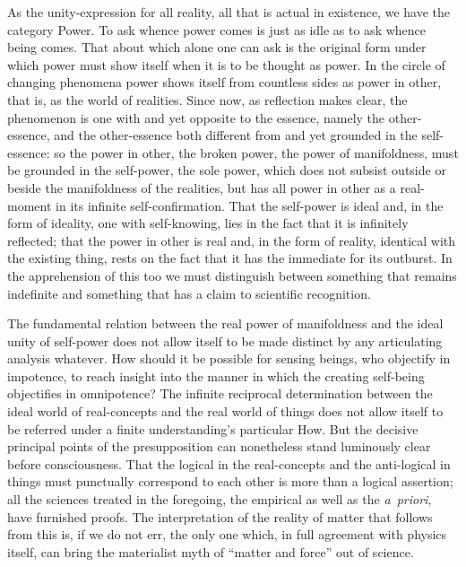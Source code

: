 \documentclass[12pt]{book}
\begin{document}
As the unity-expression for all reality, all that is actual in existence, we have the
category Power. To ask whence power comes is just as idle as to ask whence being comes. That
about which alone one can ask is the original form under which power must show itself when it
is to be thought as power. In the circle of changing phenomena power shows itself from
countless sides as power in other, that is, as the world of realities. Since now, as
reflection makes clear, the phenomenon is one with and yet opposite to the essence, namely
the other-essence, and the other-essence both different from and yet grounded in the
self-essence: so the power in other, the broken power, the power of manifoldness, must be
grounded in the self-power, the sole power, which does not subsist outside or beside the
manifoldness of the realities, but has all power in other as a real-moment in its infinite
self-confirmation. That the self-power is ideal and, in the form of ideality, one with
self-knowing, lies in the fact that it is infinitely reflected; that the power in other is
real and, in the form of reality, identical with the existing thing, rests on the fact that
it has the immediate for its outburst. In the apprehension of this too we must distinguish
between something that remains indefinite and something that has a claim to scientific
recognition.

The fundamental relation between the real power of manifoldness and the ideal unity of
self-power does not allow itself to be made distinct by any articulating analysis whatever.
How should it be possible for sensing beings, who objectify in impotence, to reach insight
into the manner in which the creating self-being objectifies in omnipotence? The infinite
reciprocal determination between the ideal world of real-concepts and the real world of
things does not allow itself to be referred under a finite understanding's particular How.
But the decisive principal points of the presupposition can nonetheless stand luminously
clear before consciousness. That the logical in the real-concepts and the anti-logical in
things must punctually correspond to each other is more than a logical assertion; all the
sciences treated in the foregoing, the empirical as well as the \textit{a~priori}, have
furnished proofs. The interpretation of the reality of matter that follows from this is, if
we do not err, the only one which, in full agreement with physics itself, can bring the
materialist myth of ``matter and force'' out of science.
\end{document}
